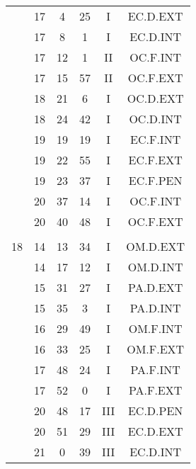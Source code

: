 \documentclass[12pt, a4paper]{article}
\begin{document}
\begin{multicols}{3}
{\begin{tabular}{c c c c c c}
	 	 	 	 & 17 & 4 & 25 & I & EC.D.EXT\\%
	 	 	 	 & 17 & 8 & 1 & I & EC.D.INT\\%
	 	 	 	 & 17 & 12 & 1 & II & OC.F.INT\\%
	 	 	 	 & 17 & 15 & 57 & II & OC.F.EXT\\%
	 	 	 	 & 18 & 21 & 6 & I & OC.D.EXT\\%
	 	 	 	 & 18 & 24 & 42 & I & OC.D.INT\\%
	 	 	 	 & 19 & 19 & 19 & I & EC.F.INT\\%
	 	 	 	 & 19 & 22 & 55 & I & EC.F.EXT\\%
	 	 	 	 & 19 & 23 & 37 & I & EC.F.PEN\\%
	 	 	 	 & 20 & 37 & 14 & I & OC.F.INT\\%
	 	 	 	 & 20 & 40 & 48 & I & OC.F.EXT\\%
	 	 	 	 & & & & & \\%
	 	 	 	18 & 14 & 13 & 34 & I & OM.D.EXT\\%
	 	 	 	 & 14 & 17 & 12 & I & OM.D.INT\\%
	 	 	 	 & 15 & 31 & 27 & I & PA.D.EXT\\%
	 	 	 	 & 15 & 35 & 3 & I & PA.D.INT\\%
	 	 	 	 & 16 & 29 & 49 & I & OM.F.INT\\%
	 	 	 	 & 16 & 33 & 25 & I & OM.F.EXT\\%
	 	 	 	 & 17 & 48 & 24 & I & PA.F.INT\\%
	 	 	 	 & 17 & 52 & 0 & I & PA.F.EXT\\%
	 	 	 	 & 20 & 48 & 17 & III & EC.D.PEN\\%
	 	 	 	 & 20 & 51 & 29 & III & EC.D.EXT\\%
	 	 	 	 & 21 & 0 & 39 & III & EC.D.INT\\%

\end{tabular}}
\end{multicols}
\end{document}
